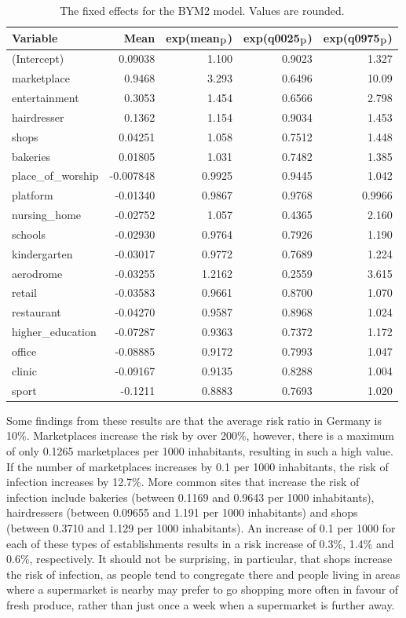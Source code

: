 \begin{table}[H] 
\caption{The fixed effects for the BYM2 model. Values are rounded. \label{fixedInfraGermany}}
\begin{tabular}{l r r r r}
\toprule
\textbf{Variable}	& \textbf{Mean}	& \textbf{exp(mean$_{\hbox{p}}$)} & \textbf{exp(q0025$_{\hbox{p}}$)} & \textbf{exp(q0975$_{\hbox{p}}$)} \\
\midrule
(Intercept) & 0.09038 & 1.100 & 0.9023 & 1.327\\
marketplace & 0.9468 & 3.293  & 0.6496  & 10.09 \\
entertainment & 0.3053 & 1.454 & 0.6566 & 2.798\\
hairdresser & 0.1362 & 1.154 & 0.9034 & 1.453\\
shops & 0.04251 & 1.058 & 0.7512 & 1.448\\
bakeries & 0.01805 & 1.031 & 0.7482 & 1.385\\
place\_of\_worship & -0.007848 & 0.9925 & 0.9445 & 1.042\\
platform & -0.01340 & 0.9867 & 0.9768 & 0.9966\\
nursing\_home & -0.02752 & 1.057 & 0.4365 & 2.160\\
schools & -0.02930 & 0.9764 & 0.7926 & 1.190\\
kindergarten & -0.03017 & 0.9772 & 0.7689 & 1.224\\
aerodrome & -0.03255 & 1.2162 & 0.2559 & 3.615\\
retail & -0.03583 & 0.9661 & 0.8700 & 1.070\\
restaurant & -0.04270 & 0.9587 & 0.8968 & 1.024\\
higher\_education & -0.07287 & 0.9363 & 0.7372 & 1.172\\
office & -0.08885  & 0.9172 & 0.7993 & 1.047\\
clinic & -0.09167 & 0.9135 & 0.8288 & 1.004\\
sport & -0.1211  & 0.8883 & 0.7693 & 1.020\\
\bottomrule
\end{tabular}
\end{table}
Some findings from these results are that the average risk ratio in Germany is 10\%. Marketplaces increase the risk by over 200\%, however, there is a maximum of only 0.1265 marketplaces per 1000 inhabitants, resulting in such a high value. If the number of marketplaces increases by 0.1 per 1000 inhabitants, the risk of infection increases by 12.7\%. More common sites that increase the risk of infection include bakeries (between 0.1169 and 0.9643 per 1000 inhabitants), hairdressers (between 0.09655 and 1.191 per 1000 inhabitants) and shops (between 0.3710 and 1.129 per 1000 inhabitants). An increase of 0.1 per 1000 for each of these types of establishments results in a risk increase of 0.3\%, 1.4\% and 0.6\%, respectively. It should not be surprising, in particular, that shops increase the risk of infection, as people tend to congregate there and people living in areas where a supermarket is nearby may prefer to go shopping more often in favour of fresh produce, rather than just once a week when a supermarket is further away. \\

